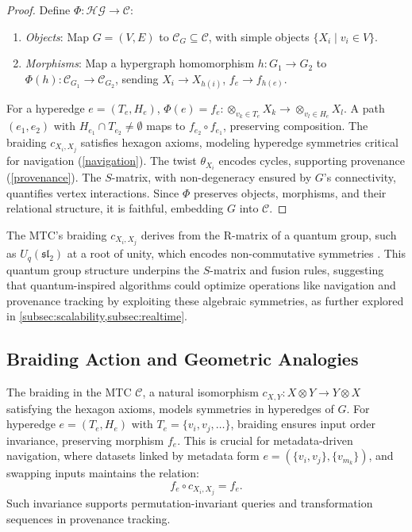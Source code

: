 \documentclass{amsart}
\begin{document}
\begin{proof}
Define \( \Phi: \mathcal{HG} \to \mathcal{C} \):

\begin{enumerate}
    \item \emph{Objects}: Map \( G = (V, E) \) to \( \mathcal{C}_G \subseteq \mathcal{C} \), with simple objects \( \{X_i \mid v_i \in V\} \).
    \item \emph{Morphisms}: Map a hypergraph homomorphism \( h: G_1 \to G_2 \) to \( \Phi(h): \mathcal{C}_{G_1} \to \mathcal{C}_{G_2} \), sending \( X_i \to X_{h(i)} \), \( f_e \to f_{h(e)} \).
\end{enumerate}


For a hyperedge \( e = (T_e, H_e) \), \( \Phi(e) = f_e: \otimes_{v_k \in T_e} X_k \to \otimes_{v_l \in H_e} X_l \). A path \( (e_1, e_2) \) with \( H_{e_1} \cap T_{e_2} \neq \emptyset \) maps to \( f_{e_2} \circ f_{e_1} \), preserving composition. The braiding \( c_{X_i, X_j} \) satisfies hexagon axioms, modeling hyperedge symmetries critical for navigation (\cref{navigation}). The twist \( \theta_{X_i} \) encodes cycles, supporting provenance (\cref{provenance}). The \( S \)-matrix, with non-degeneracy ensured by \( G \)’s connectivity, quantifies vertex interactions. Since \( \Phi \) preserves objects, morphisms, and their relational structure, it is faithful, embedding \( G \) into \( \mathcal{C} \).
\end{proof}


The MTC’s braiding \( c_{X_i, X_j} \) derives from the R-matrix of a quantum group, such as \( U_q(\mathfrak{sl}_2) \) at a root of unity, which encodes non-commutative symmetries \cite{Turaev1994}. This quantum group structure underpins the \( S \)-matrix and fusion rules, suggesting that quantum-inspired algorithms could optimize operations like navigation and provenance tracking by exploiting these algebraic symmetries, as further explored in \cref{subsec:scalability,subsec:realtime}.


\subsection{Braiding Action and Geometric Analogies} \label{subsec:braiding_action}
The braiding in the MTC \( \mathcal{C} \), a natural isomorphism \( c_{X,Y}: X \otimes Y \to Y \otimes X \) satisfying the hexagon axioms, models symmetries in hyperedges of \( G \). For hyperedge \( e = (T_e, H_e) \) with \( T_e = \{v_i, v_j, \dots\} \), braiding ensures input order invariance, preserving morphism \( f_e \). This is crucial for metadata-driven navigation, where datasets linked by metadata form \( e = (\{v_i, v_j\}, \{v_{m_k}\}) \), and swapping inputs maintains the relation:
\[
f_e \circ c_{X_i, X_j} = f_e.
\]
Such invariance supports permutation-invariant queries and transformation sequences in provenance tracking.
\end{document}
